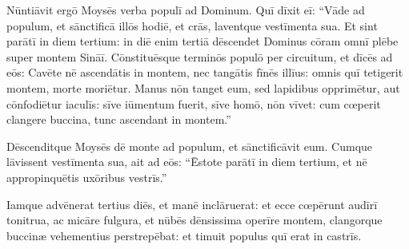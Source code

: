 Nūntiāvit ergō Moysēs verba populī ad Dominum.  Quī dīxit eī: ``Vāde ad populum, et sānctificā illōs hodiē, et crās, laventque vestīmenta sua. 
Et sint parātī in diem tertium: in diē enim tertiā dēscendet Dominus cōram
omnī plēbe super montem Sināī. 
Cōnstituēs\-que terminōs populō per circuitum, et dīcēs ad eōs: Cavēte nē
ascendātis in montem, nec tangātis fīnēs illīus: omnis quī tetigerit
montem, morte moriētur.
Manus nōn tanget eum, sed
lapidibus opprimētur, aut cōnfodiētur iaculīs:
sīve iūmentum fuerit, sīve homō, nōn vīvet: cum cœperit
clangere buccina, tunc ascendant in montem.''

Dēscenditque Moysēs dē monte ad populum, et sānctificāvit eum. Cumque
lāvissent vestīmenta sua, 
ait ad eōs: ``Ēstote parātī in diem tertium, et
nē appropinquētis uxōribus vestrīs.''

Iamque advēnerat tertius diēs, et
manē inclāruerat: et ecce cœpērunt audīrī tonitrua, ac
micāre fulgura, et nūbēs dēnsissima operīre montem, clangorque
buccinæ vehementius
perstrepēbat: et timuit populus quī erat in castrīs. 

